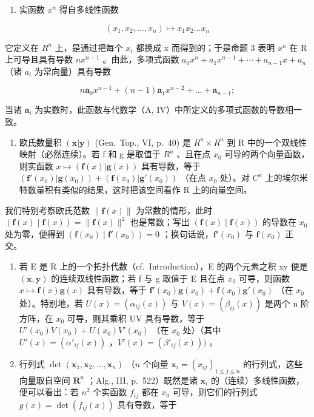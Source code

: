 \begin{enumerate}
\def\labelenumi{\arabic{enumi})}
\setcounter{enumi}{1}
\tightlist
\item
  实函数 \(x^{n}\) 得自多线性函数
\end{enumerate}

\[
(x _ {1}, x _ {2}, \ldots , x _ {n}) \mapsto x _ {1} x _ {2} \ldots x _ {n}
\]

它定义在 \(R^{n}\) 上，是通过把每个 \(x_{i}\) 都换成 x 而得到的；于是命题 3 表明 \(x^{n}\) 在 R 上可导且具有导数 \(nx^{n-1}\) 。由此，多项式函数 \(a_{0}x^{n} + a_{1}x^{n-1} + \cdots + a_{n-1}x + a_{n}\) （诸 \(a_{i}\) 为常向量）具有导数

\[
n \mathbf {a} _ {0} x ^ {n - 1} + (n - 1) \mathbf {a} _ {1} x ^ {n - 2} + \dots + \mathbf {a} _ {n - 1};
\]

当诸 \(\mathbf{a}_i\) 为实数时，此函数与代数学（A, IV）中所定义的多项式函数的导数相一致。

\begin{enumerate}
\def\labelenumi{\arabic{enumi})}
\setcounter{enumi}{2}
\tightlist
\item
  欧氏数量积 \((\mathbf{x}|\mathbf{y})\) (Gen.~Top., VI, p.~40) 是 \(R^{n}\times R^{n}\) 到 R 中的一个双线性映射（必然连续）。若 f 和 g 是取值于 \(R^{n}\) 、且在点 \(x_{0}\) 可导的两个向量函数，则实函数 \(x\mapsto(\mathbf{f}(x)|\mathbf{g}(x))\) 具有导数，等于 \((\mathbf{f}'(x_{0})|\mathbf{g}(x_{0}))+(\mathbf{f}(x_{0})|\mathbf{g}'(x_{0}))\) （在点 \(x_{0}\) 处）。对 \(C^{n}\) 上的埃尔米特数量积有类似的结果，这时把该空间看作 R 上的向量空间。
\end{enumerate}

我们特别考察欧氏范数 \(\|\mathbf{f}(x)\|\) 为常数的情形，此时 \((\mathbf{f}(x) \mid \mathbf{f}(x)) = \|\mathbf{f}(x)\|^{2}\) 也是常数；写出 \((\mathbf{f}(x) \mid \mathbf{f}(x))\) 的导数在 \(x_{0}\) 处为零，便得到 \((\mathbf{f}(x_{0}) \mid \mathbf{f}'(x_{0})) = 0\) ；换句话说，\(\mathbf{f}'(x_{0})\) 与 \(\mathbf{f}(x_{0})\) 正交。

\begin{enumerate}
\def\labelenumi{\arabic{enumi})}
\setcounter{enumi}{3}
\item
  若 E 是 R 上的一个拓扑代数（cf.~Introduction），E 的两个元素之积 xy 便是 \((\mathbf{x}, \mathbf{y})\) 的连续双线性函数；若 f 与 g 取值于 E 且在点 \(x_{0}\) 可导，则函数 \(x \mapsto \mathbf{f}(x)\mathbf{g}(x)\) 具有导数，等于 \(\mathbf{f}'(x_{0})\mathbf{g}(x_{0}) + \mathbf{f}(x_{0})\mathbf{g}'(x_{0})\) （在 \(x_{0}\) 处）。特别地，若 \(U(x) = (\alpha_{ij}(x))\) 与 \(V(x) = (\beta_{ij}(x))\) 是两个 n 阶方阵，在 \(x_{0}\) 可导，则其乘积 UV 具有导数，等于 \(U'(x_{0})V(x_{0}) + U(x_{0})V'(x_{0})\) （在 \(x_{0}\) 处）（其中 \(U'(x) = (\alpha'_{ij}(x))\) ，\(V'(x) = (\beta'_{ij}(x)))\) 。
\item
  行列式 \(\operatorname{det}(\mathbf{x}_1, \mathbf{x}_2, \ldots, \mathbf{x}_n)\) （\(n\) 个向量 \(\mathbf{x}_i = (x_{ij})_{1 \leqslant j \leqslant n}\) 的行列式，这些向量取自空间 \(\mathbf{R}^n\) ；Alg., III, p.~522）既然是诸 \(\mathbf{x}_i\) 的（连续）多线性函数，便可以看出：若 \(n^2\) 个实函数 \(f_{ij}\) 都在 \(x_0\) 可导，则它们的行列式 \(g(x) = \det(f_{ij}(x))\) 具有导数，等于
\end{enumerate}


